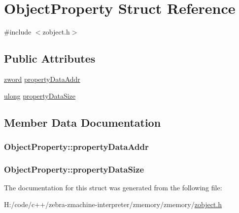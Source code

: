 \hypertarget{struct_object_property}{\section{Object\-Property Struct Reference}
\label{struct_object_property}
}


{\ttfamily \#include $<$zobject.\-h$>$}

\subsection*{Public Attributes}
\begin{DoxyCompactItemize}
\item 
\hyperlink{zglobal_8h_a6507dc55d18847442d5fb20b6c73fe73}{zword} \hyperlink{struct_object_property_a3f25a7e52c3cfe6f23dd06f7f8f9099d}{property\-Data\-Addr}
\item 
\hyperlink{zglobal_8h_a718b4eb2652c286f4d42dc18a8e71a1a}{ulong} \hyperlink{struct_object_property_ab1405932da7aee1f5de0b906a9020f78}{property\-Data\-Size}
\end{DoxyCompactItemize}


\subsection{Member Data Documentation}
\hypertarget{struct_object_property_a3f25a7e52c3cfe6f23dd06f7f8f9099d}{
\subsubsection[{property\-Data\-Addr}]{ Object\-Property\-::property\-Data\-Addr}}\label{struct_object_property_a3f25a7e52c3cfe6f23dd06f7f8f9099d}
\hypertarget{struct_object_property_ab1405932da7aee1f5de0b906a9020f78}{
\subsubsection[{property\-Data\-Size}]{ Object\-Property\-::property\-Data\-Size}}\label{struct_object_property_ab1405932da7aee1f5de0b906a9020f78}


The documentation for this struct was generated from the following file\-:\begin{DoxyCompactItemize}
\item 
H\-:/code/c++/zebra-\/zmachine-\/interpreter/zmemory/zmemory/\hyperlink{zobject_8h}{zobject.\-h}\end{DoxyCompactItemize}
